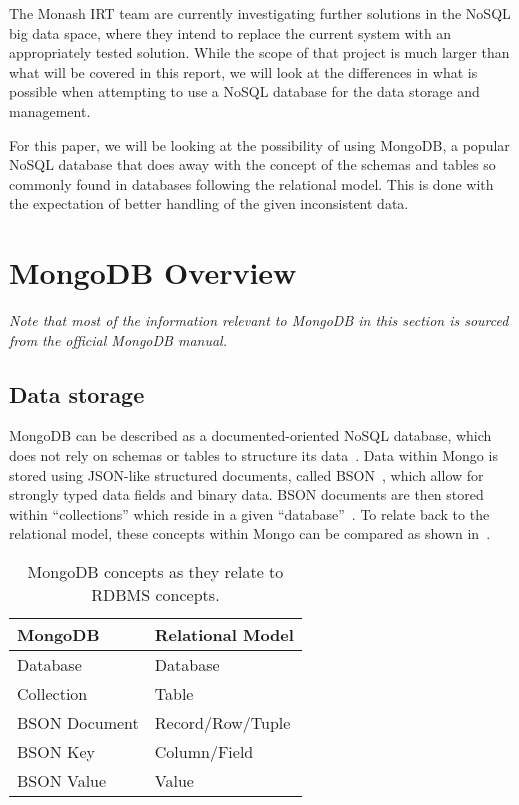 \documentclass[a4paper,11pt]{article}
\begin{document}
The Monash IRT team are currently investigating further solutions in the NoSQL big data space, where they intend to
replace the current system with an appropriately tested solution. While the scope of that project is much larger than
what will be covered in this report, we will look at the differences in what is possible when attempting to use a NoSQL
database for the data storage and management.

For this paper, we will be looking at the possibility of using MongoDB, a popular NoSQL database that does away with
the concept of the schemas and tables so commonly found in databases following the relational model. This is done with
the expectation of better handling of the given inconsistent data.


\newpage

\section{MongoDB Overview} %
\label{sec:mongo_overview}

\textit{Note that most of the information relevant to MongoDB in this section is sourced from the official MongoDB
manual.}~\cite{Mongo_man}

\subsection{Data storage} %
\label{sub:data_storage}

MongoDB can be described as a documented-oriented NoSQL database, which does not rely on schemas or tables to structure
its data~\cite{parker2013comparing}. Data within Mongo is stored using JSON-like structured documents, called
BSON~\cite{bsons6:online}, which allow for strongly typed data fields and binary data. BSON documents are then stored
within ``collections'' which reside in a given ``database''~\cite{parker2013comparing}. To relate back to the relational
model, these concepts within Mongo can be compared as shown in~.

\begin{table}[h]
\centering
\caption{MongoDB concepts as they relate to RDBMS concepts.}
\label{tab:mongo_to_relational}
\begin{tabular}{ | l | l | }

\hline
\textbf{MongoDB}  & \textbf{Relational Model} \\ \hline
Database          & Database                  \\ \hline
Collection        & Table                     \\ \hline
BSON Document     & Record/Row/Tuple          \\ \hline
BSON Key          & Column/Field              \\ \hline
BSON Value        & Value                     \\ \hline

\end{tabular}
\end{table}
\end{document}
